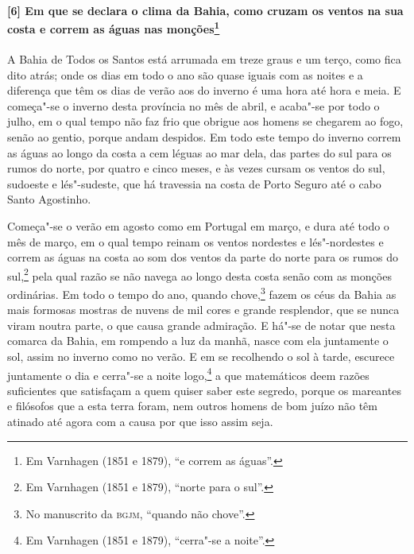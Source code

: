\begin{linenumbers}
\paragraph{[6] Em que se declara o clima da Bahia, como cruzam os ventos na sua costa e
correm as águas nas monções\protect\footnote{ Em Varnhagen (1851 e 1879), ``e correm as
águas''.}} \quad
A Bahia de Todos os Santos está arrumada em treze graus e um terço, como fica dito atrás;
onde os dias em todo o ano são quase iguais com as noites e a diferença que têm os dias de
verão aos do inverno é uma hora até hora e meia. E começa"-se o inverno desta província no
mês de abril, e acaba"-se por todo o julho, em o qual tempo não faz frio que obrigue aos
homens se chegarem ao fogo, senão ao gentio, porque andam despidos. Em todo este tempo do
inverno correm as águas ao longo da costa a cem léguas ao mar dela, das partes do sul para
os rumos do norte, por quatro e cinco meses, e às vezes cursam os ventos do sul, sudoeste
e lés"-sudeste, que há travessia na costa de Porto Seguro até o cabo Santo Agostinho.

Começa"-se o verão em agosto como em Portugal em março, e dura até todo o mês de março, em
o qual tempo reinam os ventos nordestes e lés"-nordestes e correm as águas na costa ao som
dos ventos da parte do norte para os rumos do sul,\footnote{ Em Varnhagen (1851 e 1879),
``norte para o sul''.} pela qual razão se não navega ao longo desta costa senão com as
monções ordinárias. Em todo o tempo do ano, quando chove,\footnote{ No manuscrito da
\textsc{bgjm}, ``quando não chove''.} fazem os céus da Bahia as mais formosas mostras de
nuvens de mil cores e grande resplendor, que se nunca viram noutra parte, o que causa
grande admiração. E há"-se de notar que nesta comarca da Bahia, em rompendo a luz da manhã,
nasce com ela juntamente o sol, assim no inverno como no verão. E em se recolhendo o sol à
tarde, escurece juntamente o dia e cerra"-se a noite logo,\footnote{ Em Varnhagen (1851 e
1879), ``cerra"-se a noite''.} a que matemáticos deem razões suficientes que satisfaçam a
quem quiser saber este segredo, porque os mareantes e filósofos que a esta terra foram,
nem outros homens de bom juízo não têm atinado até agora com a causa por que isso assim
seja.


\end{linenumbers}
